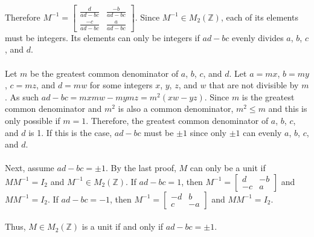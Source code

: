 \documentclass{article}
\begin{document}
\begin{enumerate}
Therefore $M^{-1} = \begin{bmatrix} \frac{d}{ad-bc} & \frac{-b}{ad-bc} \\
\frac{-c}{ad-bc} & \frac{a}{ad-bc}\end{bmatrix}$.  Since $M^{-1} \in M_2(\mathbb{Z})$,
each of its elements must be integers.  Its elements can only be
integers if $ad-bc$ evenly divides $a$, $b$, $c$, and $d$. \\
\\
Let $m$ be the greatest common denominator of $a$, $b$, $c$, and $d$.
Let $a = mx$, $b = my$, $c = mz$, and $d = mw$ for some integers
$x$, $y$, $z$, and $w$ that are not divisible by $m$.
As such $ad-bc = mxmw - mymz = m^2(xw - yz)$.  Since $m$ is the greatest common
denominator and $m^2$ is also a common denominator, $m^2 \leq m$ and this is
only possible if $m = 1$.  Therefore, the greatest common denominator of
$a$, $b$, $c$, and $d$ is 1.  If this is the case, $ad-bc$ must be $\pm1$ since
only $\pm1$ can evenly $a$, $b$, $c$, and $d$.
\\
\\
Next, assume $ad - bc = \pm1$.  By the last proof, $M$ can only be a unit if
$MM^{-1} = I_2$ and $M^{-1} \in M_2(\mathbb{Z})$.  If $ad - bc = 1$, then
$M^{-1} = \begin{bmatrix} d & -b \\ -c & a \end{bmatrix}$ and $MM^{-1} = I_2$.
If $ad - bc = -1$, then $M^{-1} = \begin{bmatrix} -d & b \\ c & -a \end{bmatrix}$
and $MM^{-1} = I_2$.
\\
\\
Thus, $M \in M_2(\mathbb{Z})$ is a unit if and only if $ad - bc = \pm1$.


\end{enumerate}
\end{document}
